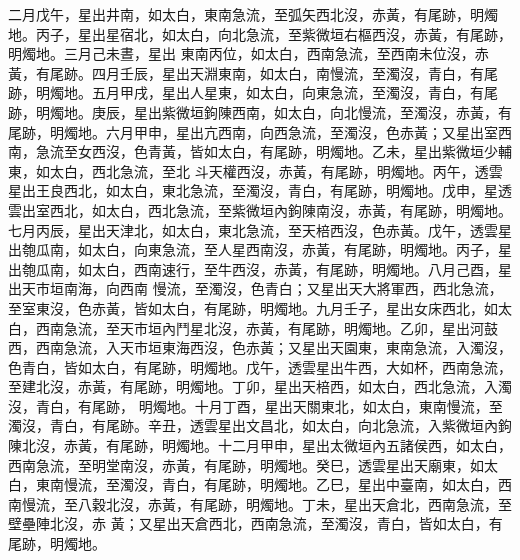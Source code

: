 \begin{pinyinscope}
 二月戊午，星出井南，如太白，東南急流，至弧矢西北沒，赤黃，有尾跡，明燭地。丙子，星出星宿北，如太白，向北急流，至紫微垣右樞西沒，赤黃，有尾跡，明燭地。三月己未晝，星出
 東南丙位，如太白，西南急流，至西南未位沒，赤黃，有尾跡。四月壬辰，星出天淵東南，如太白，南慢流，至濁沒，青白，有尾跡，明燭地。五月甲戌，星出人星東，如太白，向東急流，至濁沒，青白，有尾跡，明燭地。庚辰，星出紫微垣鉤陳西南，如太白，向北慢流，至濁沒，赤黃，有尾跡，明燭地。六月甲申，星出亢西南，向西急流，至濁沒，色赤黃；又星出室西南，急流至女西沒，色青黃，皆如太白，有尾跡，明燭地。乙未，星出紫微垣少輔東，如太白，西北急流，至北
 斗天權西沒，赤黃，有尾跡，明燭地。丙午，透雲星出王良西北，如太白，東北急流，至濁沒，青白，有尾跡，明燭地。戊申，星透雲出室西北，如太白，西北急流，至紫微垣內鉤陳南沒，赤黃，有尾跡，明燭地。七月丙辰，星出天津北，如太白，東北急流，至天棓西沒，色赤黃。戊午，透雲星出匏瓜南，如太白，向東急流，至人星西南沒，赤黃，有尾跡，明燭地。丙子，星出匏瓜南，如太白，西南速行，至牛西沒，赤黃，有尾跡，明燭地。八月己酉，星出天市垣南海，向西南
 慢流，至濁沒，色青白；又星出天大將軍西，西北急流，至室東沒，色赤黃，皆如太白，有尾跡，明燭地。九月壬子，星出女床西北，如太白，西南急流，至天市垣內鬥星北沒，赤黃，有尾跡，明燭地。乙卯，星出河鼓西，西南急流，入天市垣東海西沒，色赤黃；又星出天園東，東南急流，入濁沒，色青白，皆如太白，有尾跡，明燭地。戊午，透雲星出牛西，大如杯，西南急流，至建北沒，赤黃，有尾跡，明燭地。丁卯，星出天棓西，如太白，西北急流，入濁沒，青白，有尾跡，
 明燭地。十月丁酉，星出天關東北，如太白，東南慢流，至濁沒，青白，有尾跡。辛丑，透雲星出文昌北，如太白，向北急流，入紫微垣內鉤陳北沒，赤黃，有尾跡，明燭地。十二月甲申，星出太微垣內五諸侯西，如太白，西南急流，至明堂南沒，赤黃，有尾跡，明燭地。癸巳，透雲星出天廟東，如太白，東南慢流，至濁沒，青白，有尾跡，明燭地。乙巳，星出中臺南，如太白，西南慢流，至八穀北沒，赤黃，有尾跡，明燭地。丁未，星出天倉北，西南急流，至壁壘陣北沒，赤
 黃；又星出天倉西北，西南急流，至濁沒，青白，皆如太白，有尾跡，明燭地。




\end{pinyinscope}
